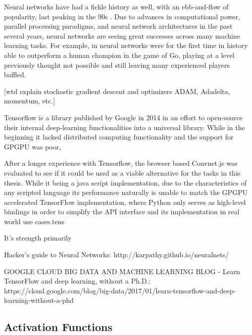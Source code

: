  Neural networks have had a fickle history as well, with an ebb-and-flow of popularity, last peaking in the 90s \cite{Bengio91z}.  Due to advances in computational power, parallel processing paradigms, and neural network architectures in the past several years, neural networks are seeing great successes across many machine learning tasks. For example, in \cite{Silver:2016aa} neural networks were for the first time in history able to outperform a human champion in the game of Go, playing at a level previously thought not possible and still leaving many experienced players baffled.  


 


 [wtd explain stochastic gradient descent and optimizers ADAM, Adadelta, momentum, etc.]



Tensorflow is a library published by Google in 2014 in an effort to open-source their internal deep-learning functionalities into a universal library. While in the beginning it lacked distributed computing functionality and the support for GPGPU was poor, 


After a longer experience with Tensorflow, the browser based Convnet.js was evaluated to see if it could be used as a viable alternative for the tasks in this thesis.
While it being a java script implementation, due to the characteristics of any scripted language its performance naturally is unable to match the GPGPU accelerated TensorFlow implementation, where Python only serves as high-level bindings in order to simplify the API interface and its implementation in real world use cases.tens

It's strength primarily 


Hacker's guide to Neural Networks: http://karpathy.github.io/neuralnets/

GOOGLE CLOUD BIG DATA AND MACHINE LEARNING BLOG - Learn TensorFlow and deep learning, without a Ph.D.: https://cloud.google.com/blog/big-data/2017/01/learn-tensorflow-and-deep-learning-without-a-phd


\subsection{Activation Functions}
\label{activation}

